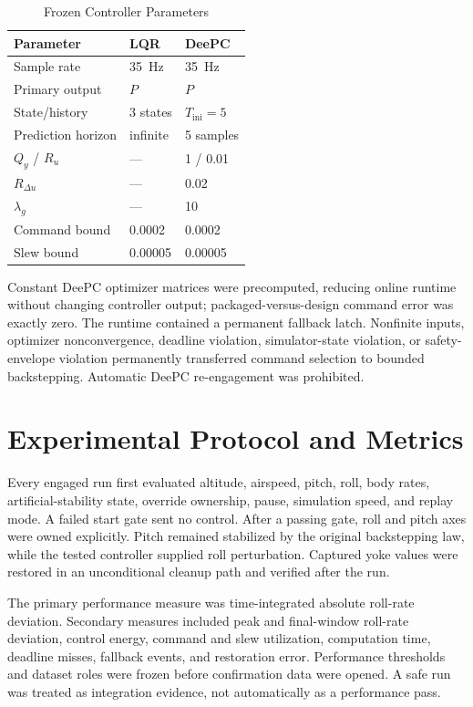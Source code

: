 \documentclass[conference]{IEEEtran}
\begin{document}
\begin{table}[t]
\caption{Frozen Controller Parameters}
\label{tab:controllers}
\centering
\begin{tabular}{@{}lll@{}}
\toprule
Parameter & LQR & DeePC \\
\midrule
Sample rate & \SI{35}{\hertz} & \SI{35}{\hertz} \\
Primary output & $P$ & $P$ \\
State/history & 3 states & $T_{\mathrm{ini}}=5$ \\
Prediction horizon & infinite & 5 samples \\
$Q_y$ / $R_u$ & --- & 1 / 0.01 \\
$R_{\Delta u}$ & --- & 0.02 \\
$\lambda_g$ & --- & 10 \\
Command bound & 0.0002 & 0.0002 \\
Slew bound & 0.00005 & 0.00005 \\
\bottomrule
\end{tabular}
\end{table}

Constant DeePC optimizer matrices were precomputed, reducing online runtime
without changing controller output; packaged-versus-design command error was
exactly zero. The runtime contained a permanent fallback latch. Nonfinite
inputs, optimizer nonconvergence, deadline violation, simulator-state
violation, or safety-envelope violation permanently transferred command
selection to bounded backstepping. Automatic DeePC re-engagement was prohibited.

\section{Experimental Protocol and Metrics}
Every engaged run first evaluated altitude, airspeed, pitch, roll, body rates,
artificial-stability state, override ownership, pause, simulation speed, and
replay mode. A failed start gate sent no control. After a passing gate, roll and
pitch axes were owned explicitly. Pitch remained stabilized by the original
backstepping law, while the tested controller supplied roll perturbation.
Captured yoke values were restored in an unconditional cleanup path and
verified after the run.

The primary performance measure was time-integrated absolute roll-rate
deviation. Secondary measures included peak and final-window roll-rate
deviation, control energy, command and slew utilization, computation time,
deadline misses, fallback events, and restoration error. Performance thresholds
and dataset roles were frozen before confirmation data were opened. A safe run
was treated as integration evidence, not automatically as a performance pass.
\end{document}

